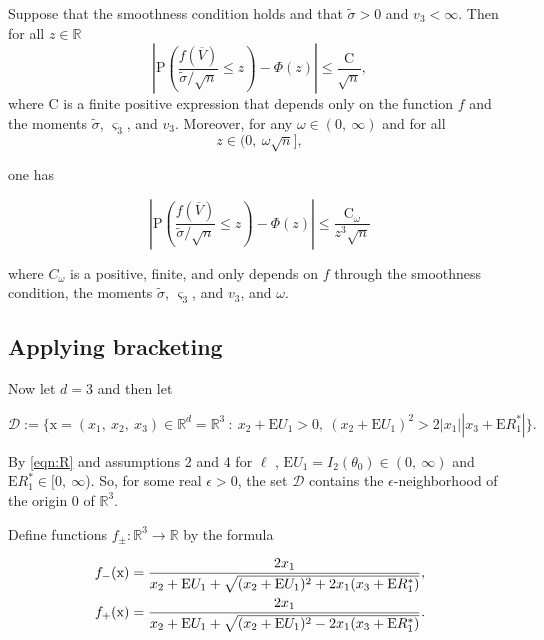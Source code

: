 \begin{theorem}\label{berryesseen}
	Suppose that the smoothness condition holds and that $\tilde{\sigma}>0$ and $v_{3}<\infty$. Then for all $z\in \mathbb{R}$
	\begin{equation}\label{berryesseen1}
		|\displaystyle \mathrm{P}(\frac{f(\overline{V})}{\tilde{\sigma}/\sqrt{n}}\leq z)-\Phi(z)|\leq\frac{\mathrm{C}}{\sqrt{n}},
	\end{equation}
	where $\mathrm{C}$ is a finite positive expression that depends only on the function $f$ and the moments $\tilde{\sigma}$, $\varsigma_{3}$, and $v_{3}$. Moreover, for any $\omega\in(0,\ \infty)$ and for all
	\begin{equation}\label{omega}
		z\in(0,\ \omega\sqrt{n}],
	\end{equation}
	
	one has
	
	\begin{equation}\label{berryesseen2}
		|\mathrm{P}(\frac{f(\overline{V})}{\tilde{\sigma}/\sqrt{n}}\leq z)-\Phi(z)|\leq\frac{\mathrm{C}_{\omega}}{z^{3}\sqrt{n}}
	\end{equation}
	
	where $C_{\omega}$ is a positive, finite, and only depends on $f$ through the smoothness condition, the moments $\tilde{\sigma}$, $\varsigma_{3}$, and $v_3$, and $\omega$.
\end{theorem}

\subsection{Applying bracketing}

Now let $d=3$ and then let

$$\mathcal{D} :=\{\mathrm{x}=(x_{1},\ x_{2},\ x_{3})\in \mathbb{R}^{d}=\mathbb{R}^{3}\ :\ x_{2}+\mathrm{E}U_{1}>0,\ (x_{2}+\mathrm{E}U_{1})^{2}>2|x_{1}||x_{3}+\mathrm{E}R_{1}^{*}|\}.$$

By \eqref{eqn:R} and assumptions 2 and 4 for $\ell$ , $\mathrm{E}U_{1}=I_2(\theta_{0})\in(0,\ \infty)$ and $\mathrm{E}R_{1}^{*}\in[0,\ \infty$). So, for some real $\epsilon>0$, the set $\mathcal{D}$ contains the $\epsilon$-neighborhood of the origin $0$ of $\mathbb{R}^{3}.$

Define functions $f_{\pm}:\mathbb{R}^{3}\rightarrow \mathbb{R}$ by the formula

\begin{equation}\label{definef}
\begin{aligned}
f_-(\mathrm{x})&=\frac{2x_1}{x_2+\mathrm{E} U_1+\sqrt{(x_2+\mathrm{E} U_1)^2+2x_1(x_3+\mathrm{E} R_1^*)}},\\
f_+(\mathrm{x})&=\frac{2x_1}{x_2+\mathrm{E} U_1+\sqrt{(x_2+\mathrm{E} U_1)^2-2x_1(x_3+\mathrm{E} R_1^*)}}.
\end{aligned}
\end{equation}

